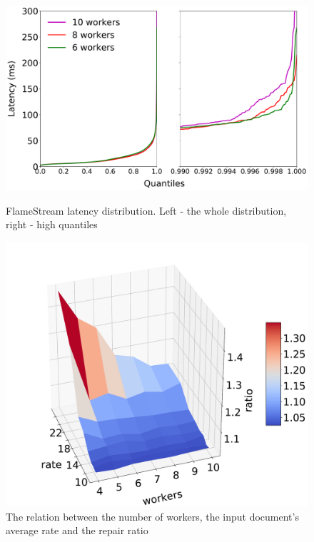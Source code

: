 \begin{figure}[ht]
  \centering
  \begin{minipage}[b]{.6\textwidth}
    \centering
    \includegraphics[width=\linewidth]{pics/fs-index-quantiles}
    \caption{FlameStream latency distribution. Left - the whole distribution, right - high quantiles}
    \label{fs-scalability}
  \end{minipage}%
  \begin{minipage}[b]{.40\textwidth}
    \centering
    \includegraphics[width=\linewidth]{pics/overhead}
    \caption{The relation between the number of workers, the input document's average rate and the repair ratio}
    \label{overhead}
  \end{minipage}%
\end{figure}

